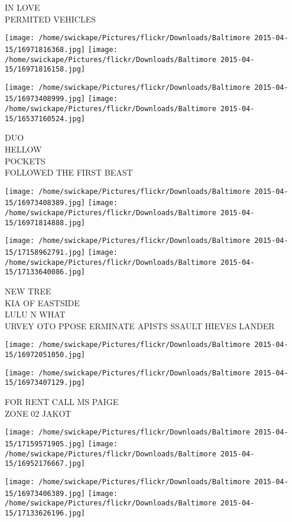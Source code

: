 \documentclass[10pt,letterpaper]{article}
\begin{document}
IN LOVE\\
PERMITED VEHICLES
\pagebreak

\texttt{[image: /home/swickape/Pictures/flickr/Downloads/Baltimore 2015-04-15/16971816368.jpg]}
\texttt{[image: /home/swickape/Pictures/flickr/Downloads/Baltimore 2015-04-15/16971816158.jpg]}

\texttt{[image: /home/swickape/Pictures/flickr/Downloads/Baltimore 2015-04-15/16973408999.jpg]}
\texttt{[image: /home/swickape/Pictures/flickr/Downloads/Baltimore 2015-04-15/16537160524.jpg]}

DUO\\
HELLOW\\
POCKETS\\
FOLLOWED THE FIRST BEAST
\pagebreak

\texttt{[image: /home/swickape/Pictures/flickr/Downloads/Baltimore 2015-04-15/16973408389.jpg]}
\texttt{[image: /home/swickape/Pictures/flickr/Downloads/Baltimore 2015-04-15/16971814888.jpg]}

\texttt{[image: /home/swickape/Pictures/flickr/Downloads/Baltimore 2015-04-15/17158962791.jpg]}
\texttt{[image: /home/swickape/Pictures/flickr/Downloads/Baltimore 2015-04-15/17133640086.jpg]}

NEW TREE\\
KIA OF EASTSIDE\\
LULU N WHAT\\
URVEY OTO PPOSE ERMINATE APISTS SSAULT HIEVES LANDER
\pagebreak

\texttt{[image: /home/swickape/Pictures/flickr/Downloads/Baltimore 2015-04-15/16972051050.jpg]}

\vspace{0.25in}
\texttt{[image: /home/swickape/Pictures/flickr/Downloads/Baltimore 2015-04-15/16973407129.jpg]}

FOR RENT CALL MS PAIGE\\
ZONE 02 JAKOT
\pagebreak

\texttt{[image: /home/swickape/Pictures/flickr/Downloads/Baltimore 2015-04-15/17159571905.jpg]}
\texttt{[image: /home/swickape/Pictures/flickr/Downloads/Baltimore 2015-04-15/16952176667.jpg]}

\texttt{[image: /home/swickape/Pictures/flickr/Downloads/Baltimore 2015-04-15/16973406389.jpg]}
\texttt{[image: /home/swickape/Pictures/flickr/Downloads/Baltimore 2015-04-15/17133626196.jpg]}
\end{document}
